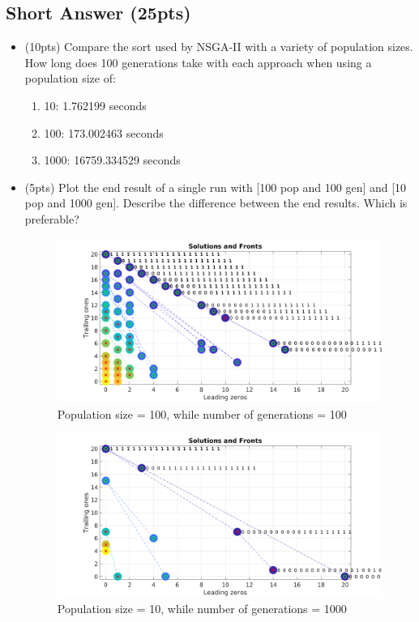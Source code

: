 \documentclass{article}
\begin{document}
\subsection{Short Answer (25pts)}
\begin{itemize}
	\item (10pts) Compare the sort used by NSGA-II with a variety of population sizes. How long does 100 generations take with each approach when using a population size of:
	\begin{enumerate}
		\item 10: 1.762199 seconds
		\item 100: 173.002463 seconds
		\item 1000: 16759.334529 seconds
	\end{enumerate}
	\item (5pts) Plot the end result of a single run with [100 pop and 100 gen] and [10 pop and 1000 gen]. Describe the difference between the end results. Which is preferable?
	
		\begin{figure}[h]
			\begin{center}
				\includegraphics[width=\textwidth]{100_gen_100_pop.png}
			\end{center}
			\caption{Population size = 100, while number of generations = 100}
			\label{figure1}
		\end{figure}
		
			\begin{figure}[h]
				\begin{center}
					\includegraphics[width=\textwidth]{1000_gen_10_pop.png}
				\end{center}
				\caption{Population size = 10, while number of generations = 1000}
				\label{figure2}
			\end{figure}
			

\end{itemize}
\end{document}
